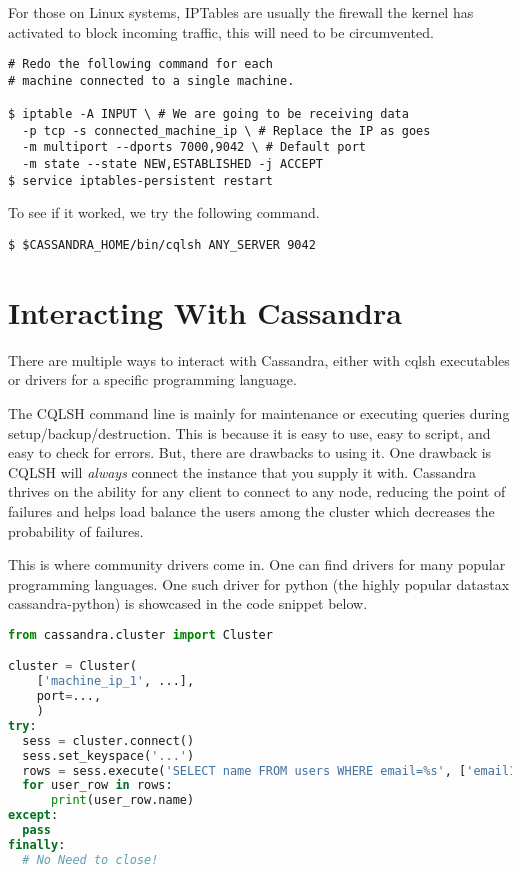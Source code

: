 \documentclass[9pt,twocolumn,twoside]{idsi}
\begin{document}
For those on Linux systems, IPTables are usually the firewall the kernel has activated to block incoming traffic, this will need to be circumvented.

\begin{lstlisting}[breaklines]
# Redo the following command for each
# machine connected to a single machine.

$ iptable -A INPUT \ # We are going to be receiving data
  -p tcp -s connected_machine_ip \ # Replace the IP as goes
  -m multiport --dports 7000,9042 \ # Default port
  -m state --state NEW,ESTABLISHED -j ACCEPT
$ service iptables-persistent restart
\end{lstlisting}

To see if it worked, we try the following command.

\begin{lstlisting}[breaklines]
$ $CASSANDRA_HOME/bin/cqlsh ANY_SERVER 9042
\end{lstlisting}


\section{Interacting With Cassandra}

There are multiple ways to interact with Cassandra, either with cqlsh executables or drivers for a specific programming language.

The CQLSH command line is mainly for maintenance or executing queries during setup/backup/destruction. This is because it is easy to use, easy to script, and easy to check for errors. But, there are drawbacks to using it. One drawback is CQLSH will \textit{always} connect the instance that you supply it with. Cassandra thrives on the ability for any client to connect to any node, reducing the point of failures and helps load balance the users among the cluster which decreases the probability of failures.

This is where community drivers come in. One can find drivers for many popular programming languages. One such driver for python (the highly popular datastax cassandra-python) is showcased in the code snippet below.

\begin{lstlisting}[language=Python]
from cassandra.cluster import Cluster

cluster = Cluster(
    ['machine_ip_1', ...],
    port=...,
    )
try:
  sess = cluster.connect()
  sess.set_keyspace('...')
  rows = sess.execute('SELECT name FROM users WHERE email=%s', ['email1@gmail.com'])
  for user_row in rows:
      print(user_row.name)
except:
  pass
finally:
  # No Need to close!
\end{lstlisting}
\end{document}
